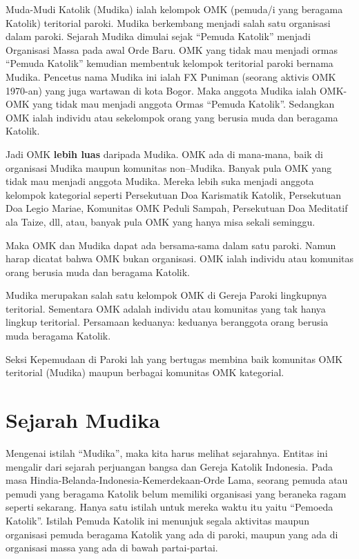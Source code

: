 
Muda-Mudi Katolik (Mudika) ialah kelompok OMK  (pemuda/i yang beragama Katolik) teritorial paroki. Mudika berkembang menjadi salah satu organisasi dalam paroki. Sejarah Mudika dimulai sejak “Pemuda Katolik” menjadi Organisasi Massa pada awal Orde Baru. OMK yang tidak mau menjadi ormas “Pemuda Katolik” kemudian membentuk kelompok teritorial paroki bernama Mudika. Pencetus nama Mudika ini ialah FX Puniman (seorang aktivis OMK 1970-an) yang juga wartawan di kota Bogor. Maka anggota Mudika ialah OMK-OMK yang tidak mau menjadi anggota Ormas “Pemuda Katolik”. Sedangkan OMK ialah individu atau sekelompok orang yang berusia muda dan beragama Katolik.

Jadi OMK \textbf{lebih luas} daripada Mudika. OMK ada di mana-mana, baik di organisasi Mudika maupun komunitas non–Mudika. Banyak pula OMK yang tidak mau menjadi anggota Mudika. Mereka lebih suka menjadi anggota kelompok kategorial seperti Persekutuan Doa Karismatik Katolik, Persekutuan Doa Legio Mariae, Komunitas OMK Peduli Sampah, Persekutuan Doa Meditatif ala Taize, dll, atau, banyak pula OMK yang hanya misa sekali seminggu.

Maka OMK dan Mudika dapat ada bersama-sama dalam satu paroki. Namun harap dicatat bahwa OMK bukan organisasi. OMK ialah individu atau komunitas orang berusia muda dan beragama Katolik.

Mudika merupakan salah satu kelompok OMK di Gereja Paroki lingkupnya teritorial. Sementara OMK adalah individu atau komunitas yang tak hanya lingkup teritorial. Persamaan keduanya: keduanya beranggota orang berusia muda beragama Katolik.

Seksi Kepemudaan di Paroki lah yang bertugas membina baik komunitas OMK  teritorial (Mudika) maupun berbagai komunitas OMK kategorial.

\section*{Sejarah Mudika}
\small
Mengenai istilah “Mudika”, maka kita harus melihat sejarahnya. Entitas ini mengalir dari sejarah perjuangan bangsa dan Gereja Katolik Indonesia. Pada masa Hindia-Belanda-Indonesia-Kemerdekaan-Orde Lama, seorang pemuda atau pemudi yang beragama Katolik belum memiliki organisasi yang beraneka ragam seperti sekarang. Hanya satu istilah untuk mereka waktu itu yaitu “Pemoeda Katolik”. Istilah Pemuda Katolik ini menunjuk segala aktivitas maupun organisasi pemuda beragama Katolik yang ada di paroki, maupun yang ada di organisasi massa yang ada di bawah partai-partai.

